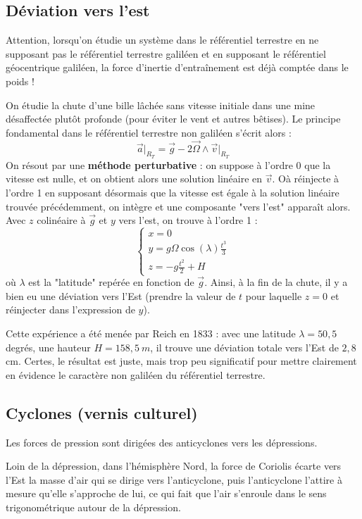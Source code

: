 \documentclass[french]{book}
\theoremstyle{plain}
\theoremstyle{definition}
\theoremstyle{remark}
\begin{document}
\subsection{Déviation vers l'est}
Attention, lorsqu'on étudie un système dans le référentiel terrestre en ne supposant pas le référentiel terrestre galiléen et en supposant le référentiel géocentrique galiléen, la force d'inertie d'entraînement est déjà comptée dans le poids ! \\ \par 
On étudie la chute d'une bille lâchée sans vitesse initiale dans une mine désaffectée plutôt profonde (pour éviter le vent et autres bêtises). Le principe fondamental dans le référentiel terrestre non galiléen s'écrit alors : $$\overrightarrow{a}\rvert_{R_T}=\overrightarrow{g}-2\overrightarrow{\Omega}\wedge\overrightarrow{v}\rvert_{R_T}$$ On résout par une \textbf{méthode perturbative} : on suppose à l'ordre 0 que la vitesse est nulle, et on obtient alors une solution linéaire en $\overrightarrow{v}$. Oà réinjecte à l'ordre 1 en supposant désormais que la vitesse est égale à la solution linéaire trouvée précédemment, on intègre et une composante "vers l'est" apparaît alors. Avec $z$ colinéaire à $\overrightarrow{g}$ et $y$ vers l'est, on trouve à l'ordre 1 : $$\begin{cases}
	x=0 \\
	\displaystyle y=g\Omega\cos(\lambda)\frac{t^3}{3}\\
	\displaystyle z=-g\frac{t^2}{2}+H
\end{cases}$$ où $\lambda$ est la "latitude" repérée en fonction de $\overrightarrow{g}$. Ainsi, à la fin de la chute, il y a bien eu une déviation vers l'Est (prendre la valeur de $t$ pour laquelle $z=0$ et réinjecter dans l'expression de $y$). \\ \par
Cette expérience a été menée par Reich en 1833 : avec une latitude $\lambda=50,5$ degrés, une hauteur $H=158,5\ m$, il trouve une déviation totale vers l'Est de $2,8$ cm. Certes, le résultat est juste, mais trop peu significatif pour mettre clairement en évidence le caractère non galiléen du référentiel terrestre.
\subsection{Cyclones (vernis culturel)}
Les forces de pression sont dirigées des anticyclones vers les dépressions. \\ \par Loin de la dépression, dans l'hémisphère Nord, la force de Coriolis écarte vers l'Est la masse d'air qui se dirige vers l'anticyclone, puis l'anticyclone l'attire à mesure qu'elle s'approche de lui, ce qui fait que l'air s'enroule dans le sens trigonométrique autour de la dépression.
\end{document}
